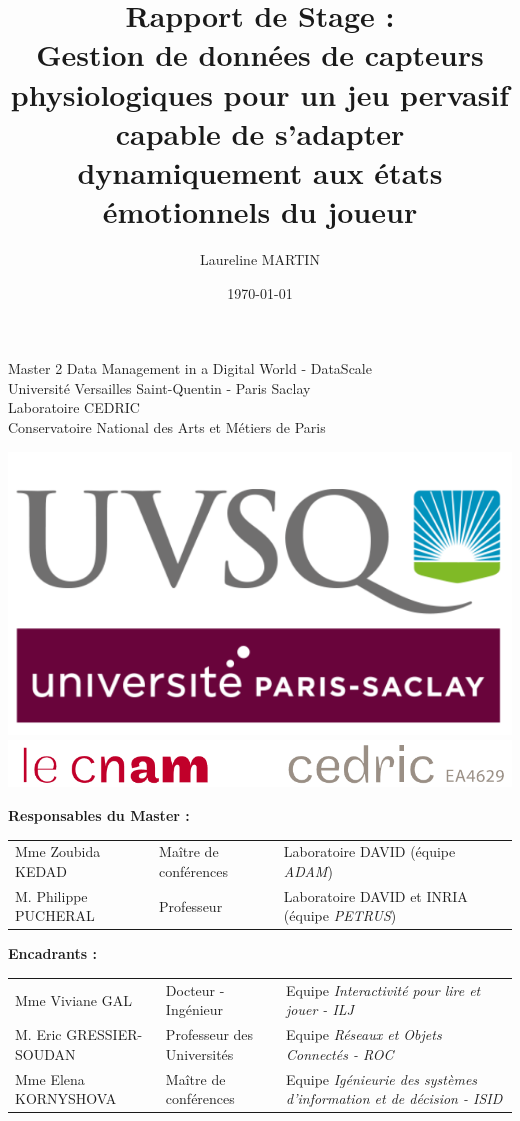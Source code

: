 \documentclass[11pt]{article}
\title{\textbf{Rapport de Stage :\\ Gestion de données de capteurs physiologiques pour un jeu pervasif capable de s'adapter dynamiquement aux états émotionnels du joueur}}
\author{Laureline MARTIN}
\date{\today}
\begin{document}
\maketitle
\begin{center}
	\Large{Master 2 Data Management in a Digital World - DataScale\\ 
		Université Versailles Saint-Quentin - Paris Saclay\bigskip\\
		Laboratoire CEDRIC\\ 
		Conservatoire National des Arts et Métiers de Paris}
\end{center}
\vfill
\begin{center}
	\includegraphics[scale=0.25]{../include/uvsq.png}
	\includegraphics[scale=0.56]{../include/logo-cedric.PNG}\\
\end{center}
\vfill
\begin{center}
	\textbf{Responsables du Master :}
\end{center}
\begin{tabular}{p{4cm}p{4.5cm}p{7.5cm}}
	\hspace*{-1cm}
	Mme Zoubida KEDAD & Maître de conférences & Laboratoire DAVID (équipe \textit{ADAM})\\
	\hspace*{-1cm}
	M. Philippe PUCHERAL & Professeur & Laboratoire DAVID et INRIA (équipe \textit{PETRUS})
\end{tabular}\par
\begin{center}
	\textbf{Encadrants :}
\end{center}
\begin{tabular}{lp{4.5cm}p{7.5cm}}
	\hspace*{-1cm}
	Mme Viviane GAL & Docteur - Ingénieur & Equipe \textit{Interactivité pour lire et jouer - ILJ}\\
	\hspace*{-1cm}
	M. Eric GRESSIER-SOUDAN & Professeur des Universités & Equipe \textit{Réseaux et Objets Connectés - ROC}\\
	\hspace*{-1cm}
	Mme Elena KORNYSHOVA & Maître de conférences & Equipe \textit{Igénieurie des systèmes d'information et de décision - ISID}
\end{tabular}
\end{document}
